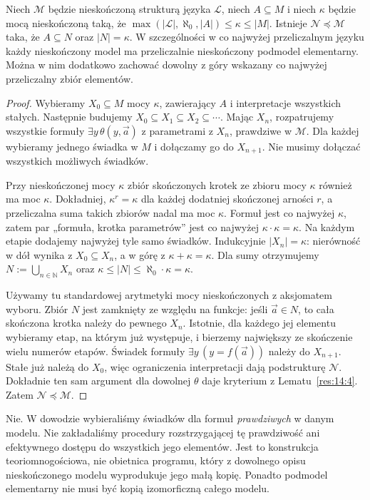 \begin{twierdzenie}\label{res:14:5}
Niech $\mathcal M$ będzie nieskończoną strukturą języka $\mathcal L$, niech $A\subseteq M$ i niech $\kappa$ będzie mocą nieskończoną taką, że $\max(|\mathcal L|,\aleph_0,|A|)\le\kappa\le|M|$. Istnieje $\mathcal N\preccurlyeq\mathcal M$ taka, że $A\subseteq N$ oraz $|N|=\kappa$. W szczególności w co najwyżej przeliczalnym języku każdy nieskończony model ma przeliczalnie nieskończony podmodel elementarny. Można w nim dodatkowo zachować dowolny z góry wskazany co najwyżej przeliczalny zbiór elementów.
\end{twierdzenie}
\begin{proof}
Wybieramy $X_0\subseteq M$ mocy $\kappa$, zawierający $A$ i interpretacje wszystkich stałych. Następnie budujemy $X_0\subseteq X_1\subseteq X_2\subseteq\cdots$. Mając $X_n$, rozpatrujemy wszystkie formuły $\exists y\,\theta(y,\vec a)$ z parametrami z $X_n$, prawdziwe w $\mathcal M$. Dla każdej wybieramy jednego świadka w $M$ i dołączamy go do $X_{n+1}$. Nie musimy dołączać wszystkich możliwych świadków.

Przy nieskończonej mocy $\kappa$ zbiór skończonych krotek ze zbioru mocy $\kappa$ również ma moc $\kappa$. Dokładniej, $\kappa^r=\kappa$ dla każdej dodatniej skończonej arności $r$, a przeliczalna suma takich zbiorów nadal ma moc $\kappa$. Formuł jest co najwyżej $\kappa$, zatem par „formuła, krotka parametrów” jest co najwyżej $\kappa\cdot\kappa=\kappa$. Na każdym etapie dodajemy najwyżej tyle samo świadków. Indukcyjnie $|X_n|=\kappa$: nierówność w dół wynika z $X_0\subseteq X_n$, a w górę z $\kappa+\kappa=\kappa$. Dla sumy otrzymujemy $N:=\bigcup_{n\in\mathbb N}X_n$ oraz $\kappa\le|N|\le\aleph_0\cdot\kappa=\kappa$.

Używamy tu standardowej arytmetyki mocy nieskończonych z aksjomatem wyboru. Zbiór $N$ jest zamknięty ze względu na funkcje: jeśli $\vec a\in N$, to cała skończona krotka należy do pewnego $X_n$. Istotnie, dla każdego jej elementu wybieramy etap, na którym już występuje, i bierzemy największy ze skończenie wielu numerów etapów. Świadek formuły $\exists y\,(y=f(\vec a))$ należy do $X_{n+1}$. Stałe już należą do $X_0$, więc ograniczenia interpretacji dają podstrukturę $\mathcal N$. Dokładnie ten sam argument dla dowolnej $\theta$ daje kryterium z Lematu~\ref{res:14:4}. Zatem $\mathcal N\preccurlyeq\mathcal M$.
\end{proof}

\begin{uwaga}\label{res:14:6}
Nie. W dowodzie wybieraliśmy świadków dla formuł \emph{prawdziwych} w danym modelu. Nie zakładaliśmy procedury rozstrzygającej tę prawdziwość ani efektywnego dostępu do wszystkich jego elementów. Jest to konstrukcja teoriomnogościowa, nie obietnica programu, który z dowolnego opisu nieskończonego modelu wyprodukuje jego małą kopię. Ponadto podmodel elementarny nie musi być kopią izomorficzną całego modelu.
\end{uwaga}

